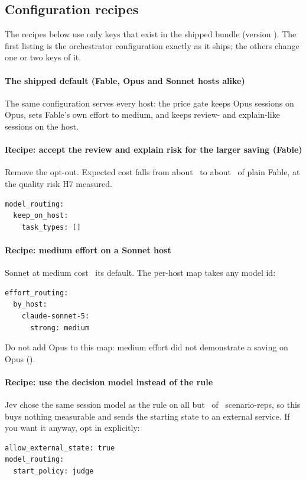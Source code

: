 \subsection{Configuration recipes}\label{sec:recipes}

The recipes below use only keys that exist in the shipped bundle (version \BundleVersion). The first listing is the
orchestrator configuration exactly as it ships; the others change one or two keys of it.

\paragraph{The shipped default (Fable, Opus and Sonnet hosts alike)} The same configuration serves every host: the
price gate keeps Opus sessions on Opus,  sets Fable's own effort to medium, and 
keeps review- and explain-like sessions on the host.\par
{\small
}

\paragraph{Recipe: accept the review and explain risk for the larger saving (Fable)} Remove the opt-out. Expected
cost falls from about \KpProxyTwo\X\ to about \KpRstarTwo\X\ of plain Fable, at the quality risk H7 measured.
\begin{lstlisting}[basicstyle=\ttfamily\footnotesize, frame=single, rulecolor=\color{okgray}]
model_routing:
  keep_on_host:
    task_types: []
\end{lstlisting}

\paragraph{Recipe: medium effort on a Sonnet host} Sonnet at medium cost \EcRatio\X\ its default. The per-host map
takes any model id:
\begin{lstlisting}[basicstyle=\ttfamily\footnotesize, frame=single, rulecolor=\color{okgray}]
effort_routing:
  by_host:
    claude-sonnet-5:
      strong: medium
\end{lstlisting}
Do not add Opus to this map: medium effort did not demonstrate a saving on Opus (\SHFourRatio\X).

\paragraph{Recipe: use the decision model instead of the rule} Jev chose the same session model as the rule on all
but \SHTwoDisc\ of \SHTwoReps\ scenario-reps, so this buys nothing measurable and sends the starting state to an
external service. If you want it anyway, opt in explicitly:
\begin{lstlisting}[basicstyle=\ttfamily\footnotesize, frame=single, rulecolor=\color{okgray}]
allow_external_state: true
model_routing:
  start_policy: judge
\end{lstlisting}

